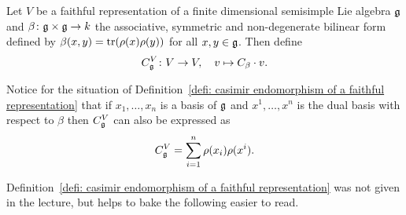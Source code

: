\begin{definition}\label{defi: casimir endomorphism of a faithful representation}
 Let $V$ be a faithful representation of a finite dimensional semisimple Lie algebra $\mathfrak{g}$ and $\beta \colon \mathfrak{g} \times \mathfrak{g} \to k$ the associative, symmetric and non-degenerate bilinear form defined by $\beta(x,y) = \operatorname{tr}(\rho(x)\rho(y))$ for all $x,y \in \mathfrak{g}$. Then define
 \[
  C^V_{\mathfrak{g}} \colon V \to V, \quad v \mapsto C_\beta \cdot v.
 \]
\end{definition}


\begin{remark}
 Notice for the situation of Definition~\ref{defi: casimir endomorphism of a faithful representation} that if $x_1, \dotsc, x_n$ is a basis of $\mathfrak{g}$ and $x^1, \dotsc, x^n$ is the dual basis with respect to $\beta$ then $C^V_{\mathfrak{g}}$ can also be expressed as
 \[
  C^V_{\mathfrak{g}} = \sum_{i=1}^n \rho(x_i) \rho(x^i).
 \]
\end{remark}


\begin{remark}
 Definition~\ref{defi: casimir endomorphism of a faithful representation} was not given in the lecture, but helps to bake the following easier to read.
\end{remark}


